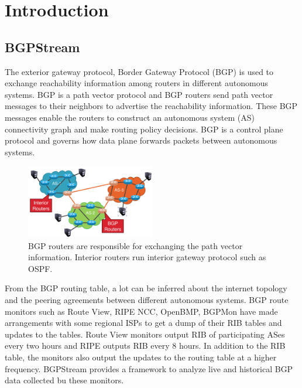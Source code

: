 \section{Introduction}\label{sec:introduction}
  \subsection{BGPStream}
 The exterior gateway protocol, Border Gateway Protocol (BGP) is used to exchange reachability information among routers in different autonomous systems. BGP is a path vector protocol and BGP routers send path vector messages to their neighbors to advertise the reachability information. These BGP messages enable the routers to construct an autonomous system (AS) connectivity graph and make routing policy decisions. BGP is a control plane protocol and governs how data plane forwards packets between autonomous systems. 
 \begin{figure}
	\includegraphics[width=0.5\textwidth]{Interior_and_BGP_routers.png}
	\caption{BGP routers are responsible for exchanging the path vector information. Interior routers run interior gateway protocol such as OSPF.}
\end{figure}
From the BGP routing table, a lot can be inferred about the internet topology and the peering agreements between different autonomous systems. BGP route monitors such as Route View, RIPE NCC, OpenBMP, BGPMon have made arrangements with some regional ISPs to get a dump of their RIB tables and updates to the tables. Route View monitors output RIB of participating ASes every two hours and RIPE outputs RIB every 8 hours\cite{orsini_bgpstream:_2016}. In addition to the RIB table, the monitors also output the updates to the routing table at a higher frequency. BGPStream provides a framework to analyze live and historical BGP data collected bu these monitors.  
